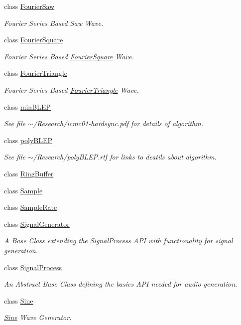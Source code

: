 \begin{DoxyCompactItemize}
class \hyperlink{classDSG_1_1FourierSaw}{Fourier\+Saw}
\begin{DoxyCompactList}\small\item\em Fourier Series Based Saw Wave. \end{DoxyCompactList}\item 
class \hyperlink{classDSG_1_1FourierSquare}{Fourier\+Square}
\begin{DoxyCompactList}\small\item\em Fourier Series Based \hyperlink{classDSG_1_1FourierSquare}{Fourier\+Square} Wave. \end{DoxyCompactList}\item 
class \hyperlink{classDSG_1_1FourierTriangle}{Fourier\+Triangle}
\begin{DoxyCompactList}\small\item\em Fourier Series Based \hyperlink{classDSG_1_1FourierTriangle}{Fourier\+Triangle} Wave. \end{DoxyCompactList}\item 
class \hyperlink{classDSG_1_1minBLEP}{min\+B\+L\+E\+P}
\begin{DoxyCompactList}\small\item\em See file $\sim$/\+Research/icmc01-\/hardsync.pdf for details of algorithm. \end{DoxyCompactList}\item 
class \hyperlink{classDSG_1_1polyBLEP}{poly\+B\+L\+E\+P}
\begin{DoxyCompactList}\small\item\em See file $\sim$/\+Research/poly\+B\+L\+E\+P.rtf for links to deatils about algorithm. \end{DoxyCompactList}\item 
class \hyperlink{classDSG_1_1RingBuffer}{Ring\+Buffer}
\item 
class \hyperlink{classDSG_1_1Sample}{Sample}
\item 
class \hyperlink{classDSG_1_1SampleRate}{Sample\+Rate}
\item 
class \hyperlink{classDSG_1_1SignalGenerator}{Signal\+Generator}
\begin{DoxyCompactList}\small\item\em A Base Class extending the \hyperlink{classDSG_1_1SignalProcess}{Signal\+Process} A\+P\+I with functionality for signal generation. \end{DoxyCompactList}\item 
class \hyperlink{classDSG_1_1SignalProcess}{Signal\+Process}
\begin{DoxyCompactList}\small\item\em An Abstract Base Class defining the basics A\+P\+I needed for audio generation. \end{DoxyCompactList}\item 
class \hyperlink{classDSG_1_1Sine}{Sine}
\begin{DoxyCompactList}\small\item\em \hyperlink{classDSG_1_1Sine}{Sine} Wave Generator. \end{DoxyCompactList}\end{DoxyCompactItemize}
